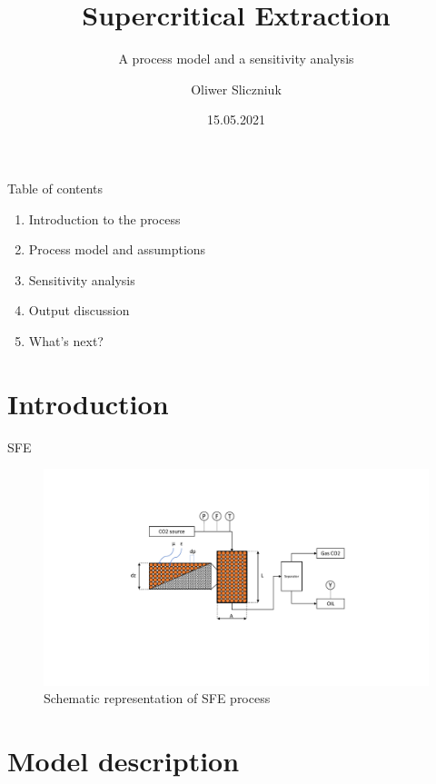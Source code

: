 \documentclass[8pt]{beamer}
\title{Supercritical Extraction}
\subtitle{A process model and a sensitivity analysis}
\date{15.05.2021}
\author{Oliwer Sliczniuk}
\institute{Aalto University}
\begin{document}
	
	\maketitle
	
	\begin{frame}{Table of contents}
		\begin{enumerate}
			\item Introduction to the process
			\item Process model and assumptions
			\item Sensitivity analysis
			\item Output discussion 
			\item What's next?
		\end{enumerate}
	\end{frame}
	
	\section[Supercritical extraction - process description]{Introduction}
	
	\begin{frame}[fragile]{SFE}
	\begin{figure}[!h]
		\centering
		\includegraphics[trim = 4cm 5cm 4cm 3cm,clip,width=\linewidth]{Figures/SFE_Diagram.pdf}
		\caption{Schematic representation of SFE process}
		\label{fig:SFE_drawing}
	\end{figure} 
	\end{frame}
	
	\section{Model description}
	
\end{document}
